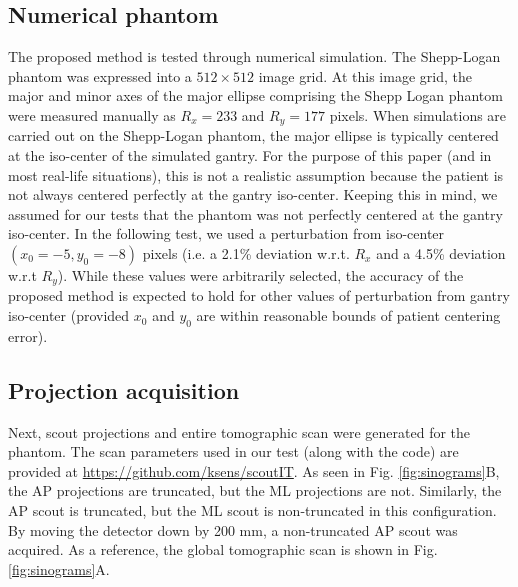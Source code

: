 \documentclass[]{spie}
\begin{document}
\subsection{Numerical phantom}
The proposed method is tested through numerical simulation. The Shepp-Logan phantom was expressed into a $512 \times 512$ image grid. At this image grid, the major and minor axes of the major ellipse comprising the Shepp Logan phantom were measured manually as $R_x = 233$ and $R_y = 177$ pixels. When simulations are carried out on the Shepp-Logan phantom, the major ellipse is typically centered at the iso-center of the simulated gantry. For the purpose of this paper (and in most real-life situations), this is not a realistic assumption because the patient is not always centered perfectly at the gantry iso-center. Keeping this in mind, we assumed for our tests that the phantom was not perfectly centered at the gantry iso-center. In the following test, we used a perturbation from iso-center $(x_0 = -5, y_0 = -8)$ pixels (i.e. a 2.1\% deviation w.r.t. $R_x$ and a 4.5\% deviation w.r.t $R_y$). While these values were arbitrarily selected, the accuracy of the proposed method is expected to hold for other values of perturbation from gantry iso-center (provided $x_0$ and $y_0$ are within reasonable bounds of patient centering error). %

\subsection{Projection acquisition}
Next, scout projections and entire tomographic scan were generated for the phantom. The scan parameters used in our test (along with the code) are provided at \url{https://github.com/ksens/scoutIT}. As seen in Fig. \ref{fig:sinograms}B, the AP projections are truncated, but the ML projections are not. Similarly, the AP scout is truncated, but the ML scout is non-truncated in this configuration. By moving the detector down by 200 mm, a non-truncated AP scout was acquired. As a reference, the global tomographic scan is shown in Fig. \ref{fig:sinograms}A.  

\end{document}
